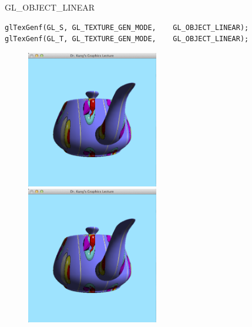 \documentclass{beamer}
\begin{document}
\begin{frame}[fragile]{{\sf GL\_OBJECT\_LINEAR}}

\lstset{language=C++} 
\begin{lstlisting}
glTexGenf(GL_S, GL_TEXTURE_GEN_MODE, 	GL_OBJECT_LINEAR);
glTexGenf(GL_T, GL_TEXTURE_GEN_MODE, 	GL_OBJECT_LINEAR);
\end{lstlisting}

\begin{figure}[h!]
  \centering
	\includegraphics[height=6cm]{OGL_texture/objLinear1.png}
	\includegraphics[height=6cm]{OGL_texture/objLinear2.png}
\end{figure}

\end{frame}
\end{document}
